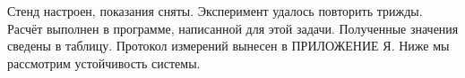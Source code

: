 Стенд настроен, показания сняты.
Эксперимент удалось повторить трижды.
Расчёт выполнен в программе, написанной для этой задачи.
Полученные значения сведены в таблицу.
Протокол измерений вынесен в ПРИЛОЖЕНИЕ Я.
Ниже мы рассмотрим устойчивость системы.
